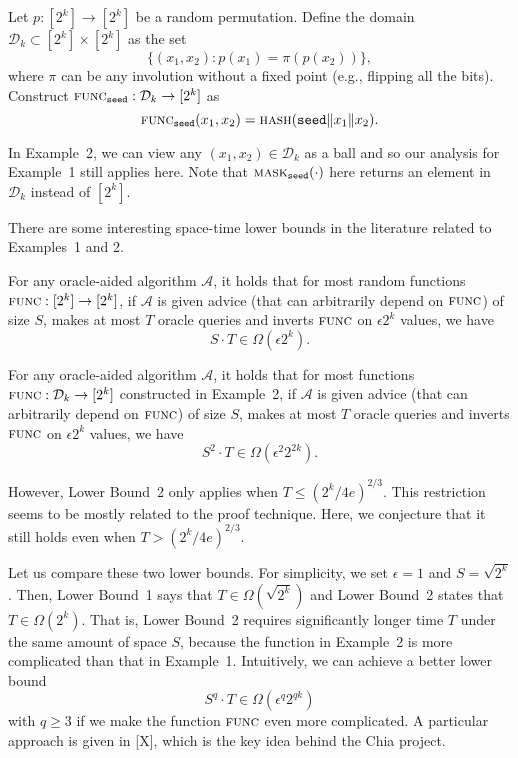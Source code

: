 \documentclass[12pt,draftcls,onecolumn]{IEEEtran}
\newcommand{\seed}{\texttt{seed}}
\newcommand{\mask}{\textsc{mask}}
\newcommand{\func}{\textsc{func}}
\newcommand{\hash}{\textsc{hash}}
\begin{document}

 Let $p: [2^k] \to [2^k]$ be a random permutation. Define the domain $\mathcal{D}_k \subset [2^k] \times [2^k]$ as the set 
\[
\{ (x_1, x_2) : p(x_1) = \pi\left( p(x_2) \right) \},
\]
where $\pi$ can be any involution without a fixed point (e.g., flipping all the bits).
Construct $\func_{\seed}: \mathcal{D}_k \to [2^k]$ as 
\[
\func_{\seed}(x_1, x_2) = \hash(\seed \| x_1 \| x_2).
\]

In Example~2, we can view any $(x_1, x_2) \in \mathcal{D}_k$ as a ball and so
our analysis for Example~1 still applies here. 
Note that $\mask_{\seed}(\cdot)$ here returns an element in $\mathcal{D}_k$ instead of $[2^k]$.

There are some interesting space-time lower bounds in the literature 
related to Examples~1 and 2. 

For any oracle-aided algorithm $\mathcal{A}$, it holds that for most random functions
$\func: [2^k] \to [2^k]$, if $\mathcal{A}$ is given advice (that can arbitrarily depend on $\func$)
of size $S$, makes at most $T$ oracle queries and inverts $\func$ on $\epsilon 2^k$ values, we have
\[
S \cdot T \in \Omega\left(\epsilon 2^k \right).
\]

For any oracle-aided algorithm $\mathcal{A}$, it holds that for most functions
$\func: \mathcal{D}_k \to [2^k]$ constructed in Example~2, if $\mathcal{A}$ is given advice (that can arbitrarily depend on $\func$)
of size $S$, makes at most $T$ oracle queries and inverts $\func$ on $\epsilon 2^k$ values, we have
\[
S^2 \cdot T \in \Omega\left(\epsilon^2 2^{2k} \right).
\]

However, Lower Bound~2 only applies when $T \le \left(2^k/4 e \right)^{2/3}$. This restriction seems to be mostly related to the proof technique. Here, we conjecture that it still holds even when $T > \left(2^k/4 e \right)^{2/3}$.

Let us compare these two lower bounds. For simplicity, we set $\epsilon = 1$ and $S = \sqrt{2^k}$. Then, Lower Bound~1 says that 
$T \in \Omega\left(\sqrt{2^k} \right)$ and Lower Bound~2 states that $T \in \Omega\left( 2^k \right)$.
That is, Lower Bound~2 requires significantly longer time $T$ under the same amount of space $S$, because the function in Example~2 is more complicated than that in Example~1.
Intuitively, we can achieve a better lower bound 
\[
S^q \cdot T \in \Omega\left(\epsilon^q 2^{qk} \right)
\]
with $q \ge 3$ if we make the function $\func$ even more complicated. A particular approach is given in [X], which is the key idea behind the Chia project.
\end{document}

